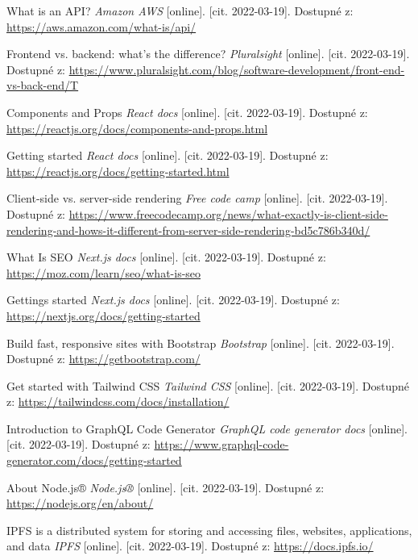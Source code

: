 \begin{thebibliography}{100}
 What is an API? \textit{Amazon AWS} [online]. [cit. 2022-03-19]. Dostupné z: \url{https://aws.amazon.com/what-is/api/}

 Frontend vs. backend: what's the difference? \textit{Pluralsight} [online]. [cit. 2022-03-19]. Dostupné z: \url{https://www.pluralsight.com/blog/software-development/front-end-vs-back-end/T}

 Components and Props \textit{React docs} [online]. [cit. 2022-03-19]. Dostupné z: \url{https://reactjs.org/docs/components-and-props.html}

 Getting started \textit{React docs} [online]. [cit. 2022-03-19]. Dostupné z: \url{https://reactjs.org/docs/getting-started.html}

 Client-side vs. server-side rendering \textit{Free code camp} [online]. [cit. 2022-03-19]. Dostupné z: \url{https://www.freecodecamp.org/news/what-exactly-is-client-side-rendering-and-hows-it-different-from-server-side-rendering-bd5c786b340d/}

 What Is SEO \textit{Next.js docs} [online]. [cit. 2022-03-19]. Dostupné z: \url{https://moz.com/learn/seo/what-is-seo}

 Gettings started \textit{Next.js docs} [online]. [cit. 2022-03-19]. Dostupné z: \url{https://nextjs.org/docs/getting-started}

 Build fast, responsive sites with Bootstrap \textit{Bootstrap} [online]. [cit. 2022-03-19]. Dostupné z: \url{https://getbootstrap.com/}

 Get started with Tailwind CSS \textit{Tailwind CSS} [online]. [cit. 2022-03-19]. Dostupné z: \url{https://tailwindcss.com/docs/installation/}

 Introduction to GraphQL Code Generator \textit{GraphQL code generator docs} [online]. [cit. 2022-03-19]. Dostupné z: \url{https://www.graphql-code-generator.com/docs/getting-started}

 About Node.js® \textit{Node.js®} [online]. [cit. 2022-03-19]. Dostupné z: \url{https://nodejs.org/en/about/}

 IPFS is a distributed system for storing and accessing files, websites, applications, and data \textit{IPFS} [online]. [cit. 2022-03-19]. Dostupné z: \url{https://docs.ipfs.io/}


\end{thebibliography}
